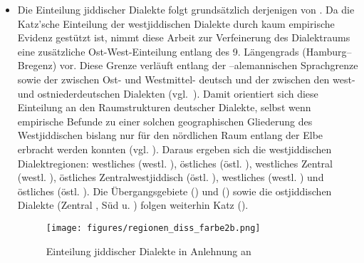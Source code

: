 \begin{itemize}
\item Die Einteilung jiddischer Dialekte folgt grundsätzlich derjenigen von \citealt{Katz1983}. Da die Katz'sche Einteilung der westjiddischen Dialekte durch kaum empirische Evidenz gestützt ist, nimmt diese Arbeit zur Verfeinerung des Dialektraums eine zusätzliche  Ost-West-Einteilung entlang des 9. Längengrads (Hamburg–Bregenz) vor.\label{BregenzHH} Diese Grenze verläuft entlang der –alemannischen Sprachgrenze sowie der zwischen Ost- und Westmittel- \linebreak deutsch und der zwischen den west- und ostniederdeutschen Dialekten (vgl.\, \citealt{Wiesinger1983a}). 
Damit orientiert sich diese Einteilung an den Raumstrukturen deutscher Dialekte, selbst wenn empirische Befunde zu einer solchen geographischen Gliederung des Westjiddischen bislang nur für den nördlichen Raum entlang der Elbe erbracht werden konnten (vgl. \citealt[209]{Ramer1997}). 
Daraus ergeben sich die westjiddischen Dialektregionen: 
westliches  (westl. \hai{{\SWJ}}), 
östliches  (östl. \hai{{\SWJ}}), 
westliches Zentral (westl. \hai{{\ZWJ}}), 
östliches Zentralwest\-jid\-disch (östl. \hai{{\ZWJ}}), 
westliches  (westl. \hai{{\NWJ}}) und 
östliches  (östl. \hai{{\NWJ}}). 
Die Übergangsgebiete  () und  () sowie die ostjiddischen Dialekte (Zentral ‏\hai{{\ZOJ}}, Süd \hai{{\SOJ}} u.  \hai{{\NOJ}})  folgen weiterhin Katz (\citeyear{Katz1983}). 

\begin{figure} 
\centering
\texttt{[image: figures/regionen\_diss\_farbe2b.png]}
		\caption{\label{karteregionen}Einteilung jiddischer Dialekte in Anlehnung an \cite{Katz1983}}
		\end{figure}
 


\end{itemize}
